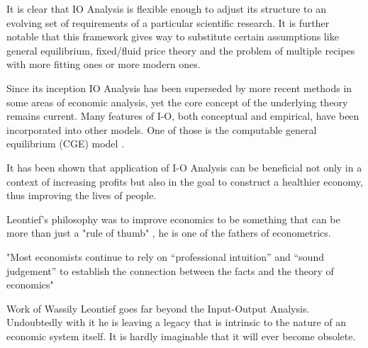 \documentclass[12pt,a4paper]{scrartcl}
\begin{document}
	It is clear that IO Analysis is flexible enough to adjust its structure to an evolving set of requirements of a particular scientific research. It is further notable that this framework gives way to substitute certain assumptions like general equilibrium, fixed/fluid price theory and the problem of multiple recipes  with more fitting ones or more modern ones. 
	
	Since its inception IO Analysis has been superseded by more recent methods in some areas of economic analysis, yet the core concept of the underlying theory remains current. Many features of I-O, both conceptual and empirical, have been incorporated into other models. One of those is the computable general equilibrium (CGE) model \cite[p.295, p. 297]{rose1995} .
	
	It has been shown that application of I-O Analysis can be beneficial not only in a context of increasing profits but also in the goal to construct a healthier economy, thus improving the lives of people.
	
	Leontief's philosophy was to improve economics to be something that can be more than just a "rule of thumb" \cite[p.~36]{leontief1960niedergang}, he is one of the fathers of econometrics.
	
	"Most economists continue to rely on “professional intuition” and “sound judgement” to establish the connection between the facts and the theory of economics" \cite[p.~13]{leontief1951input}
	
	Work of Wassily Leontief goes far beyond the Input-Output Analysis. Undoubtedly with it he is leaving a legacy that is intrinsic to the nature of an economic system itself. It is hardly imaginable that it will ever become obsolete.
	
	
	
	\clearpage
	
	
		
	\listoftodos

	
	
\end{document}
